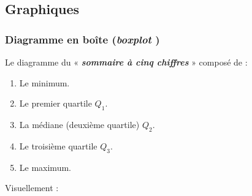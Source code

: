 \documentclass[french]{article}
\begin{document}
\begin{multicols*}{2}
\columnbreak
\subsection{Graphiques}\label{subsec:OrderStatsPlots}
\subsubsection{Diagramme en boîte (\og \textit{boxplot} \fg{})}\label{subsubsec:OrderStatsBoxPlot}
Le diagramme du « \textit{\textbf{sommaire à cinq chiffres}} » composé de : 
\begin{enumerate}[label = \circled{\arabic*}{trueblue}]
	\item	Le minimum.
	\item	Le premier quartile $Q_{1}$.
	\item	La médiane (deuxième quartile) $Q_{2}$.
	\item	Le troisième quartile $Q_{3}$.
	\item	Le maximum.
\end{enumerate}

\bigskip

Visuellement : 

\begin{center}
\begin{tikzpicture}[x=0.75pt,y=0.75pt,yscale=-1,xscale=1]


\end{tikzpicture}
\end{center}
\end{multicols*}
\end{document}

